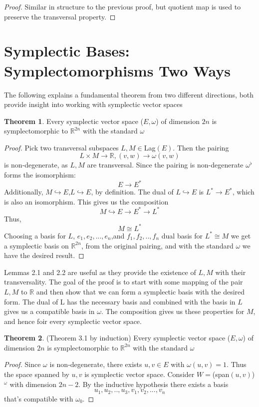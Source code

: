 \documentclass[12pt]{article}
\theoremstyle{definition}
\newtheorem{theorem}{Theorem}[section]
\begin{document}
\begin{proof}
Similar in structure to the previous proof, but quotient map is used to preserve the transversal property. 
\end{proof}

\section{Symplectic Bases: Symplectomorphisms Two Ways}
The following explains a fundamental theorem from two different directions, both provide insight into working with symplectic vector spaces
\begin{theorem}
Every symplectic vector space ($E,\omega$) of dimension $2n$ is symplectomorphic to $\mathbb{R}^{2n}$ with the standard $\omega$
\end{theorem}
\begin{proof}
Pick two transversal subspaces $L,M \in $Lag$(E)$. Then the pairing $$ L \times M \rightarrow \mathbb{R}, (v,w) \rightarrow \omega(v,w)$$ is non-degenerate, as $L,M$ are transversal. Since the pairing is non-degenerate $\omega^\flat$ forms the isomorphism: $$ E \rightarrow E^*$$Additionally, $M \hookrightarrow E$,$L \hookrightarrow E$, by definition. The dual of $L \hookrightarrow E$ is $L^* \rightarrow E^*$, which is also an isomorphism. This gives us the composition 
$$ M \hookrightarrow  E \rightarrow E^* \rightarrow L^*$$
Thus, $$ M \cong L^*$$
Choosing a basis for $L$, $e_1,e_2,...,e_n$,and $f_1,f_2,..,f_n$ dual basis for $L^* \cong M$ we get a symplectic basis on $\mathbb{R}^{2n}$, from the original pairing, and with the standard $\omega$ we have the desired result.
\end{proof}

Lemmas 2.1 and 2.2 are useful as they provide the existence of $L,M$ with their transversality. The goal of the proof is to start with some mapping of the pair $L,M$ to $\mathbb{R}$ and then show that we can form a symplectic basis with the desired form. The dual of L has the necessary basis and combined with the basis in $L$ gives us a compatible basis in $\omega$. The composition gives us these properties for $M$, and hence foir every symplectic vector space.

\begin{theorem}(Theorem 3.1 by induction)
Every symplectic vector space ($E,\omega$) of dimension $2n$ is symplectomorphic to $\mathbb{R}^{2n}$ with the standard $\omega$
\end{theorem}
\begin{proof}
Since $\omega$ is non-degenerate, there exists $u,v \in E$ with $\omega(u,v)=1$. Thus the space spanned by $u,v$ is symplectic vector space. Consider $W = $(span$(u,v)$)$^\omega$ with dimension $2n -2$. By the inductive hypothesis there exists a basis $$ u_1,u_2,..,u_3,v_1,v_2,...,v_n$$
that's compatible with $\omega_0$.
\end{proof}
\end{document}
